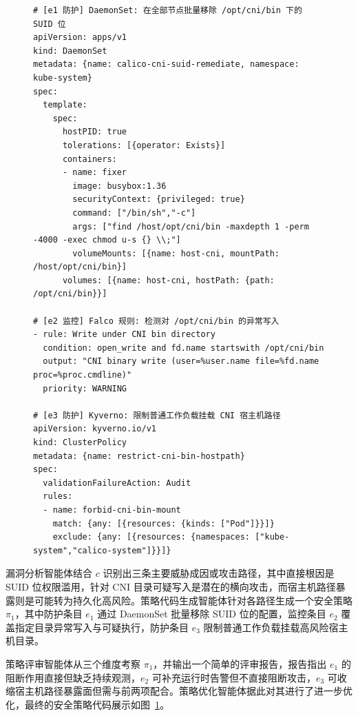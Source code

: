 \begin{figure}[htb]
    \centering
    \setlength{\abovecaptionskip}{3pt}
    \setlength{\belowcaptionskip}{0pt}
    \begin{tcolorbox}[enhanced,colback=gray!3,colframe=gray!55,boxrule=0.4pt,arc=1mm,left=2mm,right=2mm,top=0.5mm,bottom=0.5mm]
    \begin{Verbatim}[fontsize=\scriptsize,baselinestretch=0.8,breaklines,breakanywhere]
# [e1 防护] DaemonSet: 在全部节点批量移除 /opt/cni/bin 下的 SUID 位
apiVersion: apps/v1
kind: DaemonSet
metadata: {name: calico-cni-suid-remediate, namespace: kube-system}
spec:
  template:
    spec:
      hostPID: true
      tolerations: [{operator: Exists}]
      containers:
      - name: fixer
        image: busybox:1.36
        securityContext: {privileged: true}
        command: ["/bin/sh","-c"]
        args: ["find /host/opt/cni/bin -maxdepth 1 -perm -4000 -exec chmod u-s {} \\;"]
        volumeMounts: [{name: host-cni, mountPath: /host/opt/cni/bin}]
      volumes: [{name: host-cni, hostPath: {path: /opt/cni/bin}}]

# [e2 监控] Falco 规则: 检测对 /opt/cni/bin 的异常写入
- rule: Write under CNI bin directory
  condition: open_write and fd.name startswith /opt/cni/bin
  output: "CNI binary write (user=%user.name file=%fd.name proc=%proc.cmdline)"
  priority: WARNING

# [e3 防护] Kyverno: 限制普通工作负载挂载 CNI 宿主机路径
apiVersion: kyverno.io/v1
kind: ClusterPolicy
metadata: {name: restrict-cni-bin-hostpath}
spec:
  validationFailureAction: Audit
  rules:
  - name: forbid-cni-bin-mount
    match: {any: [{resources: {kinds: ["Pod"]}}]}
    exclude: {any: [{resources: {namespaces: ["kube-system","calico-system"]}}]}
    \end{Verbatim}
    \end{tcolorbox}
    \label{fig:chap3-falco-kyverno}
\end{figure}

漏洞分析智能体结合 $c$ 识别出三条主要威胁成因或攻击路径，其中直接根因是 SUID 位权限滥用，针对 CNI 目录可疑写入是潜在的横向攻击，而宿主机路径暴露则是可能转为持久化高风险。策略代码生成智能体针对各路径生成一个安全策略 $\pi_1$，其中防护条目 $e_1$ 通过 DaemonSet 批量移除 SUID 位的配置，监控条目 $e_2$ 覆盖指定目录异常写入与可疑执行，防护条目 $e_3$ 限制普通工作负载挂载高风险宿主机目录。

策略评审智能体从三个维度考察 $\pi_1$，并输出一个简单的评审报告，报告指出 $e_1$ 的阻断作用直接但缺乏持续观测，$e_2$ 可补充运行时告警但不直接阻断攻击，$e_3$ 可收缩宿主机路径暴露面但需与前两项配合。策略优化智能体据此对其进行了进一步优化，最终的安全策略代码展示如图~\ref{fig:chap3-falco-kyverno}。


